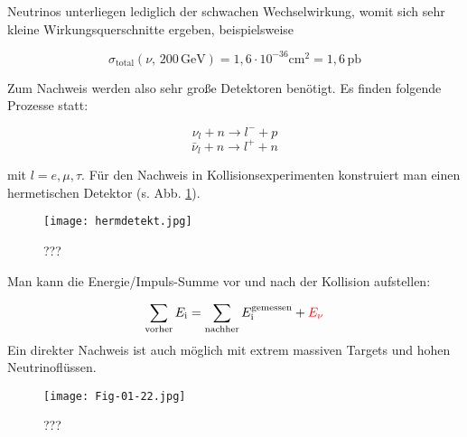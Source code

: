 Neutrinos unterliegen lediglich der schwachen Wechselwirkung, womit sich sehr kleine
Wirkungsquerschnitte ergeben, beispielsweise

\[\sigma_\text{total}(\nu,\,200\,\text{GeV}) = 1{,}6\cdot10^{-36}\text{cm}^2 = 1{,}6\,\text{pb} \]

Zum Nachweis werden also sehr große Detektoren benötigt. Es finden folgende Prozesse statt:

\[ \nu_l + n \longrightarrow l^- + p \]
\[ \bar{\nu}_l + n \longrightarrow l^+ + n \]

mit $l=e,\mu,\tau$. Für den Nachweis in Kollisionsexperimenten konstruiert man einen hermetischen
Detektor (s. Abb. \ref{hermdetekt}). 

\begin{figure}[H]
	\centering
	\texttt{[image: hermdetekt.jpg]}
	\caption{	 ???}
	\label{hermdetekt}
\end{figure}

Man kann die Energie/Impuls-Summe vor und nach der Kollision aufstellen:

\[\sum_\text{vorher} E_\text{i} = \sum_\text{nachher} E_\text{i}^\text{gemessen}
+\textcolor{red}{E_\nu}\]
%
Ein direkter Nachweis ist auch möglich mit extrem massiven Targets und hohen Neutrinoflüssen. 

\begin{figure}[H]
	\centering
	\texttt{[image: Fig-01-22.jpg]}
	\caption{	 ???}
	\label{keinplan}
\end{figure}
